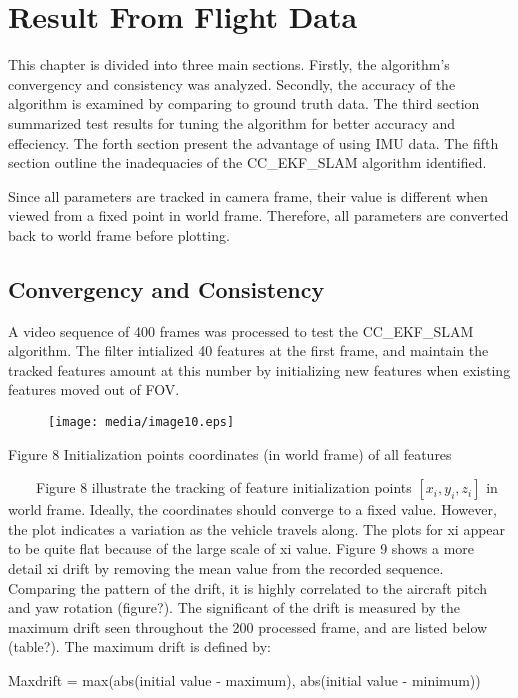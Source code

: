 \chapter{Result From Flight Data}\label{ch:FlightResult}

This chapter is divided into three main sections. Firstly, the
algorithm's convergency and consistency was analyzed. Secondly, the
accuracy of the algorithm is examined by comparing to ground truth
data. The third section summarized test results for tuning the
algorithm for better accuracy and effeciency. The forth section
present the advantage of using IMU data. The fifth section outline
the inadequacies of the CC\_EKF\_SLAM algorithm identified.

Since all parameters are tracked in camera frame, their value is 
different when viewed from a fixed point in world frame. Therefore, all 
parameters are converted back to world frame before plotting. 

\section{Convergency and Consistency}

A video sequence of 400 frames was processed to test the CC\_EKF\_SLAM
algorithm. The filter intialized 40 features at the first frame, and
maintain the tracked features amount at this number by initializing
new features when existing features moved out of FOV. 
\begin{figure}[h]
\centering
\texttt{[image: media/image10.eps]}
\end{figure}


Figure 8 Initialization points coordinates (in world frame) of all 
features

\ \ \ \ Figure 8 illustrate the tracking of feature initialization 
points $[x_{i}, y_{i}, z_{i}]$ in world frame. Ideally, the 
coordinates should converge to a fixed value. However, the plot 
indicates a variation as the vehicle travels along. The plots for xi 
appear to be quite flat because of the large scale of xi value. Figure 9 
shows a more detail xi drift by removing the mean value from the 
recorded sequence. Comparing the pattern of the drift, it is highly 
correlated to the aircraft pitch and yaw rotation (figure?). The 
significant of the drift is measured by the maximum drift seen 
throughout the 200 processed frame, and are listed below (table?). The 
maximum drift is defined by:

Maxdrift = max(abs(initial value - maximum), abs(initial value - 
minimum)) 

